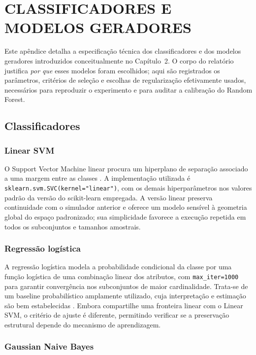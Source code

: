 \chapter{CLASSIFICADORES E MODELOS GERADORES}
\label{ap:modelos}

Este apêndice detalha a especificação técnica dos classificadores e dos modelos geradores introduzidos conceitualmente no Capítulo~2. O corpo do relatório justifica \emph{por que} esses modelos foram escolhidos; aqui são registrados os parâmetros, critérios de seleção e escolhas de regularização efetivamente usados, necessários para reproduzir o experimento e para auditar a calibração do Random Forest.

\section{Classificadores}

\subsection{Linear SVM}

O Support Vector Machine linear procura um hiperplano de separação associado a uma margem entre as classes \cite{cortes1995}. A implementação utilizada é \texttt{sklearn.svm.\allowbreak SVC(kernel="linear")}, com os demais hiperparâmetros nos valores padrão da versão do scikit-learn empregada. A versão linear preserva continuidade com o simulador \SLACGS{} anterior e oferece um modelo sensível à geometria global do espaço padronizado; sua simplicidade favorece a execução repetida em todos os subconjuntos e tamanhos amostrais.

\subsection{Regressão logística}

A regressão logística modela a probabilidade condicional da classe por uma função logística de uma combinação linear dos atributos, com \texttt{max\_iter=1000} para garantir convergência nos subconjuntos de maior cardinalidade. Trata-se de um baseline probabilístico amplamente utilizado, cuja interpretação e estimação são bem estabelecidas \cite{hosmer2013}. Embora compartilhe uma fronteira linear com o Linear SVM, o critério de ajuste é diferente, permitindo verificar se a preservação estrutural depende do mecanismo de aprendizagem.

\subsection{Gaussian Naive Bayes}

